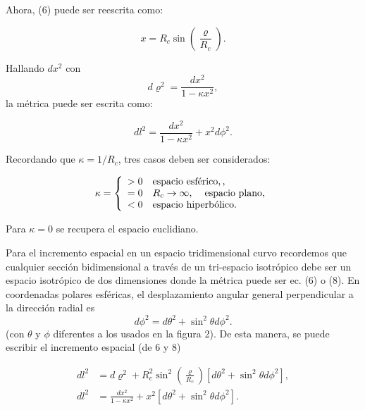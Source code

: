 \documentclass{article}
\begin{document}
Ahora, (6) puede ser reescrita como: 

    \begin{equation}
        x = R_c \sin \left(\frac{\varrho}{R_c} \right).
    \end{equation}
    
    Hallando $dx^2$ con $$d\varrho^2 = \frac{dx^2}{1-\kappa x^2},$$
    la métrica puede ser escrita como: 
    
    \begin{equation}
        dl^2 = \frac{dx^2}{1-\kappa x^2} + x^2d\phi^2.
    \end{equation}
    
    \vspace{0.6cm}
    Recordando que $\kappa = 1/R_c$, tres casos deben ser considerados: 
    
    \begin{equation*}
     \label{eq:aqui-le-mostramos-como-hacerle-la-llave-grande}
     \kappa  = \left\{
	       \begin{array}{ll}
		 > 0      & {\text{espacio esférico}},, \\
		 = 0 & R_c \rightarrow{\infty}, \hspace{0.4cm}  {\text{espacio plano}}, \\
		 < 0     & {\text{espacio hiperbólico}}.
	       \end{array}
	     \right.
   \end{equation*}
    
    \vspace{0.4cm}
    
Para $\kappa = 0$ se recupera el espacio euclidiano.

Para el incremento espacial en un espacio tridimensional curvo recordemos que cualquier sección bidimensional a través de un tri-espacio isotrópico debe ser un espacio isotrópico de dos dimensiones donde la métrica puede ser ec. (6) o (8). En coordenadas polares esféricas, el desplazamiento angular general perpendicular a la dirección radial es 
\begin{equation}
    d\phi^2 = d\theta^2 +  \sin^2 \theta d\phi^2.
\end{equation}
 (con $\theta$ y $\phi$ diferentes a los usados en la figura 2). De esta manera, se puede escribir el incremento espacial (de 6 y 8) 


\begin{align}
        dl^2 & = d\varrho^2 + R_c^2 \sin^2\left(\frac{\varrho}{R_c} \right) [d\theta^2 +  \sin^2 \theta d\phi^2], \\
        dl^2 &  =  \frac{dx^2}{1-\kappa x^2} + x^2[d\theta^2 +  \sin^2 \theta d\phi^2].
\end{align}
\end{document}
